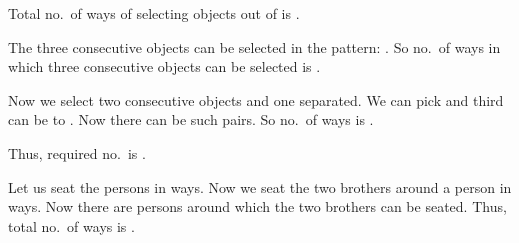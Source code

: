   Total no.\ of ways of selecting  objects out of  is .

  The three consecutive objects can be selected in the pattern: . So no.\ of ways in which three consecutive objects can be selected is .

  Now we select two consecutive objects and one separated. We can pick  and third can be 
  to . Now there can be  such pairs. So no.\ of ways is .

  Thus, required no.\ is .
\item Let us seat the  persons in  ways. Now we seat the two brothers around a person in 
  ways. Now there are  persons around which the two brothers can be seated. Thus, total no.\ of ways
  is .
\stopitemize
